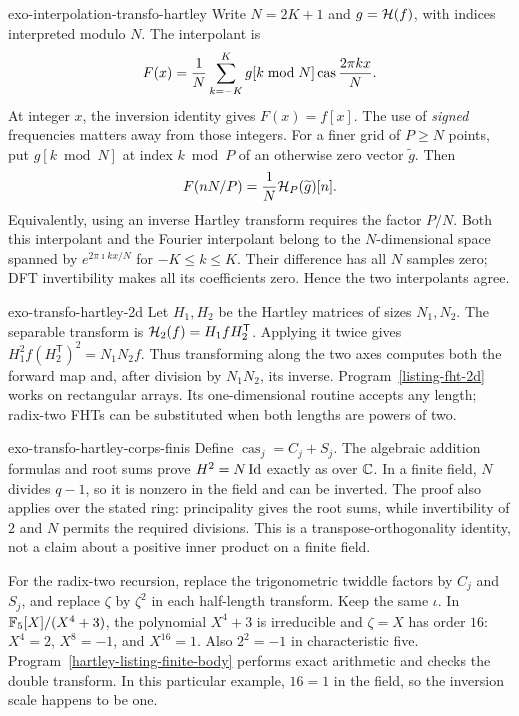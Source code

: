 \begin{correction}{exo-interpolation-transfo-hartley}
Write $N=2K+1$ and $g=\mathcal{H}(f)$, with indices interpreted modulo $N$.
The interpolant is
\[
 F(x)=\frac1N\sum_{k=-K}^{K}g[k\bmod N]\operatorname{cas}\frac{2\pi kx}{N}.
\]
At integer $x$, the inversion identity gives $F(x)=f[x]$. The use of
\emph{signed} frequencies matters away from those integers.
For a finer grid of $P\geq N$ points, put $g[k\bmod N]$ at index
$k\bmod P$ of an otherwise zero vector $\widetilde g$. Then
\[
 F(nN/P)=\frac1N\mathcal{H}_P(\widetilde g)[n].
\]
Equivalently, using an inverse Hartley transform requires the factor
$P/N$. Both this interpolant and the Fourier interpolant belong to the
$N$-dimensional space spanned by $e^{2\pi\imath kx/N}$ for $-K\leq k\leq K$.
Their difference has all $N$ samples zero; DFT invertibility makes all its
coefficients zero. Hence the two interpolants agree.
\end{correction}

\begin{correction}{exo-transfo-hartley-2d}
Let $H_1,H_2$ be the Hartley matrices of sizes $N_1,N_2$. The separable
transform is $\mathcal{H}_2(f)=H_1fH_2^{\mathsf T}$. Applying it twice gives
$H_1^2f(H_2^{\mathsf T})^2=N_1N_2f$. Thus transforming along the two axes
computes both the forward map and, after division by $N_1N_2$, its inverse.
Program~\ref{listing-fht-2d} works on rectangular arrays. Its one-dimensional
routine accepts any length; radix-two FHTs can be substituted when both
lengths are powers of two.
\begin{listing}[H]
\caption{A separable Hartley transform on a rectangular array.}
\label{listing-fht-2d}
\end{listing}
\end{correction}

\begin{correction}{exo-transfo-hartley-corps-finis}
Define $\operatorname{cas}_j=C_j+S_j$. The algebraic addition formulas
and root sums prove $H^2=N\operatorname{Id}$ exactly as over $\mathbb{C}$. In a finite field,
$N$ divides $q-1$, so it is nonzero in the field and can be inverted.
The proof also applies over the stated ring: principality gives the root
sums, while invertibility of $2$ and $N$ permits the required divisions.
This is a transpose-orthogonality identity, not a claim about a positive
inner product on a finite field.

For the radix-two recursion, replace the trigonometric twiddle factors by
$C_j$ and $S_j$, and replace $\zeta$ by $\zeta^2$ in each half-length
transform. Keep the same $\iota$. In $\mathbb{F}_5[X]/(X^4+3)$, the polynomial
$X^4+3$ is irreducible and $\zeta=X$ has order $16$:
$X^4=2$, $X^8=-1$, and $X^{16}=1$. Also $2^2=-1$ in characteristic five.
Program~\ref{hartley-listing-finite-body} performs exact arithmetic and
checks the double transform. In this particular example, $16=1$ in the
field, so the inversion scale happens to be one.
\begin{listing}[H]
\caption{An exact finite-field Hartley transform and its inversion check.}
\label{hartley-listing-finite-body}
\end{listing}
\end{correction}


